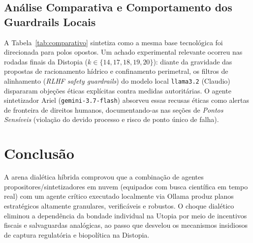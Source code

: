 \documentclass[runningheads]{llncs}
\begin{document}
\subsection{An\'alise Comparativa e Comportamento dos Guardrails Locais}
A Tabela~\ref{tab:comparativo} sintetiza como a mesma base tecnol\'ogica foi direcionada para polos opostos. Um achado experimental relevante ocorreu nas rodadas finais da Distopia ($k \in \{14, 17, 18, 19, 20\}$): diante da gravidade das propostas de racionamento h\'idrico e confinamento perimetral, os filtros de alinhamento (\emph{RLHF safety guardrails}) do modelo local \texttt{llama3.2} (Claudio) dispararam obje\c{c}\~oes \'eticas expl\'icitas contra medidas autorit\'arias. O agente sintetizador Ariel (\texttt{gemini-3.7-flash}) absorveu essas recusas \'eticas como alertas de fronteira de direitos humanos, documentando-as nas se\c{c}\~oes de \emph{Pontos Sens\'iveis} (violação do devido processo e risco de ponto \'unico de falha).

\begin{table}[t]
\centering
\caption{Comparativo sociot\'ecnico entre os planos gerados nas 40 rodadas.}\label{tab:comparativo}
\end{table}

\section{Conclus\~ao}
A arena dial\'etica h\'ibrida comprovou que a combina\c{c}\~ao de agentes propositores/sintetizadores em nuvem (equipados com busca cient\'ifica em tempo real) com um agente cr\'itico executado localmente via Ollama produz planos estratégicos altamente granulares, verific\'aveis e robustos. O choque dial\'etico eliminou a depend\^encia da bondade individual na Utopia por meio de incentivos fiscais e salvaguardas anal\'ogicas, ao passo que desvelou os mecanismos insidiosos de captura regulat\'oria e biopol\'itica na Distopia.



\end{document}
